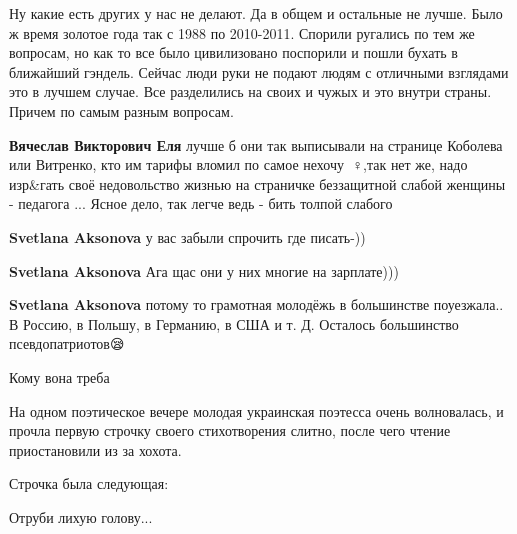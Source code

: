 \begin{itemize}
\begin{itemize}
Ну какие есть других у нас не делают. Да в общем и остальные не лучше. Было ж
время золотое года так с 1988 по 2010-2011. Спорили ругались по тем же
вопросам, но как то все было цивилизовано поспорили и пошли бухать в ближайший
гэндель. Сейчас люди руки не подают людям с отличными взглядами это в лучшем
случае. Все разделились на своих и чужых и это внутри страны. Причем по самым
разным вопросам.


\textbf{Вячеслав Викторович Еля} лучше б они так выписывали на странице
Коболева или Витренко, кто им тарифы вломил по самое нехочу 🤦♀️,так нет
же, надо изр\&гать своё недовольство жизнью на страничке беззащитной слабой
женщины - педагога ... Ясное дело, так легче ведь - бить толпой слабого


\textbf{Svetlana Aksonova} у вас забыли спрочить где писать-))


\textbf{Svetlana Aksonova} Ага щас они у них многие на зарплате)))


\textbf{Svetlana Aksonova} потому то грамотная молодёжь в большинстве
поуезжала.. В Россию, в Польшу, в Германию, в США и т. Д. Осталось большинство
псевдопатриотов😪
\end{itemize}


Кому вона треба


На одном поэтическое вечере молодая украинская поэтесса очень волновалась, и
прочла первую строчку своего стихотворения слитно, после чего чтение
приостановили из за хохота.

Строчка была следующая:

Отруби лихую голову...


\end{itemize}

